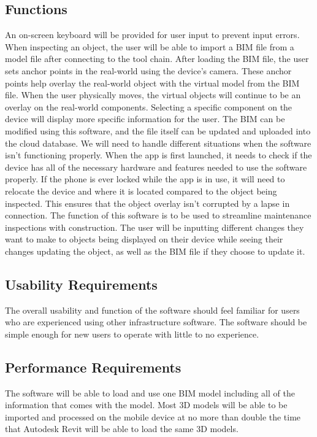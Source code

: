 \documentclass[onecolumn, draftclsnofoot,10pt, compsoc]{IEEEtran}
\begin{document}
    \subsection{Functions}
        An on-screen keyboard will be provided for user input to prevent input errors. When inspecting an object, the user will be able to import a BIM file from a model file after connecting to the tool chain. After loading the BIM file, the user sets anchor points in the real-world using the device's camera. These anchor points help overlay the real-world object with the virtual model from the BIM file. When the user physically moves, the virtual objects will continue to be an overlay on the real-world components. Selecting a specific component on the device will display more specific information for the user. The BIM can be modified using this software, and the file itself can be updated and uploaded into the cloud database.
        We will need to handle different situations when the software isn't functioning properly. When the app is first launched, it needs to check if the device has all of the necessary hardware and features needed to use the software properly. If the phone is ever locked while the app is in use, it will need to relocate the device and where it is located compared to the object being inspected. This ensures that the object overlay isn't corrupted by a lapse in connection.
        The function of this software is to be used to streamline maintenance inspections with construction. The user will be inputting different changes they want to make to objects being displayed on their device while seeing their changes updating the object, as well as the BIM file if they choose to update it.

    \subsection{Usability Requirements}
        The overall usability and function of the software should feel familiar for users who are experienced using other infrastructure software. The software should be simple enough for new users to operate with little to no experience.
    \subsection{Performance Requirements}
        The software will be able to load and use one BIM model including all of the information that comes with the model. Most 3D models will be able to be imported and processed on the mobile device at no more than double the time that Autodesk Revit will be able to load the same 3D models.
\end{document}
